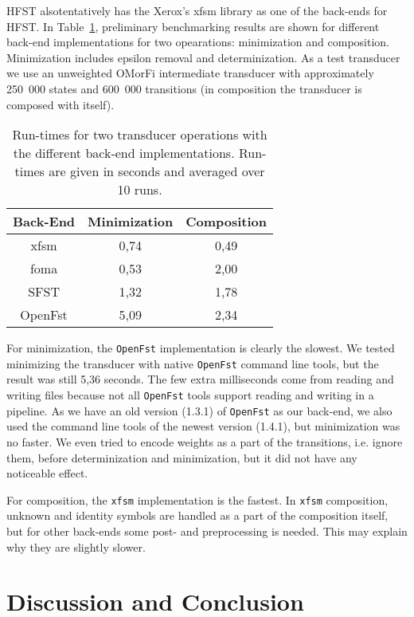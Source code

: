 \documentclass{llncs}
\begin{document}
 HFST alsotentatively has the Xerox's xfsm library as one of the back-ends for HFST.
In Table~\ref{operationtimes}, preliminary benchmarking results are shown for different back-end
implementations for two opearations: minimization and composition. Minimization includes epsilon
removal and determinization. As a test transducer we use an 
unweighted OMorFi intermediate transducer with approximately 250~000 states and 600~000 transitions (in composition
the transducer is composed with itself).

\begin{table}[h!]
  \centering
  \caption{Run-times for two transducer operations with the different back-end implementations.
    Run-times are given in seconds and averaged over 10 runs.}
  \begin{tabular}{c c c }
    \hline
    Back-End & Minimization & Composition \\ \hline
    xfsm & 0,74 & 0,49 \\
    foma & 0,53 & 2,00 \\
    SFST & 1,32 & 1,78 \\
    OpenFst & 5,09 & 2,34 \\ \hline
  \end{tabular}
  \label{operationtimes}
\end{table}

For minimization, the {\tt OpenFst} implementation is clearly the slowest. We tested minimizing
the transducer with native {\tt OpenFst} command line tools, but the result was still 5,36 seconds.
The few extra milliseconds come from reading and writing files because not all {\tt OpenFst} tools support reading
and writing in a pipeline. As we have an old version (1.3.1) of {\tt OpenFst} as our back-end, we also
used the command line tools of the newest version (1.4.1), but minimization was no faster.
We even tried to encode weights as a part of the transitions, i.e. ignore them, before determinization
and minimization, but it did not have any noticeable effect.

For composition, the {\tt xfsm} implementation is the fastest. In {\tt xfsm} composition, unknown and identity
symbols are handled as a part of the composition itself, but for other back-ends some post- and preprocessing is
needed. This may  explain why they are slightly slower.

\section{Discussion and Conclusion}\label{sec:discussion}
\end{document}
